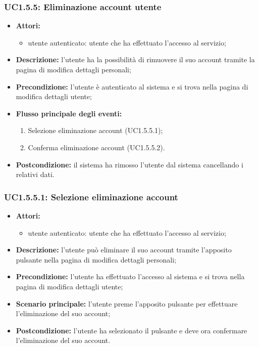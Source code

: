 \subsubsection{UC1.5.5: Eliminazione account utente}
\begin{itemize}
	\item \textbf{Attori:}
	\begin{itemize}
		\item utente autenticato: utente che ha effettuato l'accesso al servizio;
	\end{itemize}
	\item \textbf{Descrizione:} l'utente ha la possibilità di rimuovere il suo account tramite la pagina di modifica dettagli personali;
	\item \textbf{Precondizione:} l'utente è autenticato al sistema e si trova nella pagina di modifica dettagli utente;
	\item \textbf{Flusso principale degli eventi:}
	\begin{enumerate}
		\item Selezione eliminazione account (UC1.5.5.1);
		\item Conferma eliminazione account (UC1.5.5.2).
	\end{enumerate}
	\item \textbf{Postcondizione:} il sistema ha rimosso l'utente dal sistema cancellando i relativi dati.
\end{itemize}

\subsubsection{UC1.5.5.1: Selezione eliminazione account}
\begin{itemize}
	\item \textbf{Attori:}
	\begin{itemize}
		\item utente autenticato: utente che ha effettuato l'accesso al servizio;
	\end{itemize}
	\item \textbf{Descrizione:} l'utente può eliminare il suo account tramite l'apposito pulsante nella pagina di modifica dettagli personali;
	\item \textbf{Precondizione:} l'utente ha effettuato l'accesso al sistema e si trova nella pagina di modifica dettagli utente;
	\item \textbf{Scenario principale:} l'utente preme l'apposito pulsante per effettuare l'eliminazione del suo account;
	\item \textbf{Postcondizione:} l'utente ha selezionato il pulsante e deve ora confermare l'eliminazione del suo account.
\end{itemize}

